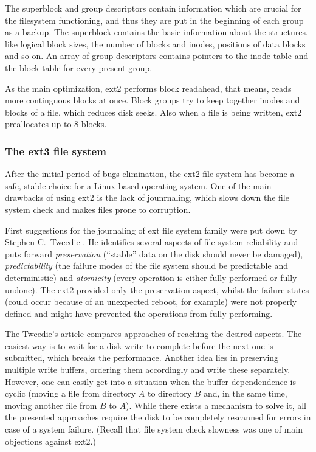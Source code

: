 \documentclass{acm_proc_article-sp}
\begin{document}
The superblock and group descriptors contain information which are crucial for the filesystem functioning, and thus they are put in the beginning of each group as a backup. The superblock contains the basic information about the structures, like logical block sizes, the number of blocks and inodes, positions of data blocks and so on. An array of group descriptors contains pointers to the inode table and the block table for every present group.

As the main optimization, ext2 performs block readahead, that means, reads more continguous blocks at once. Block groups try to keep together inodes and blocks of a file, which reduces disk seeks. Also when a file is being written, ext2 preallocates up to 8 blocks.

\subsubsection{The ext3 file system}

After the initial period of bugs elimination, the ext2 file system has become a safe, stable choice for a Linux-based operating system. One of the main drawbacks of using ext2 is the lack of jounrnaling, which slows down the file system check and makes files prone to corruption.

First suggestions for the journaling of ext file system family were put down by Stephen C.\ Tweedie \cite{extjournal}. He identifies several aspects of file system reliability and puts forward {\it preservation} (``stable'' data on the disk should never be damaged), {\it predictability} (the failure modes of the file system should be predictable and deterministic) and {\it atomicity} (every operation is either fully performed or fully undone). The ext2 provided only the preservation aspect, whilst the failure states (could occur because of an unexpected reboot, for example) were not properly defined and might have prevented the operations from fully performing.

The Tweedie's article \cite{extjournal} compares approaches of reaching the desired aspects. The easiest way is to wait for a disk write to complete before the next one is submitted, which breaks the performance. Another idea lies in preserving multiple write buffers, ordering them accordingly and write these separately. However, one can easily get into a situation when the buffer dependendence is cyclic (moving a file from directory $A$ to directory $B$ and, in the same time, moving another file from $B$ to $A$). While there exists a mechanism to solve it, all the presented approaches require the disk to be completely rescanned for errors in case of a system failure. (Recall that file system check slowness was one of main objections against ext2.)
\end{document}
